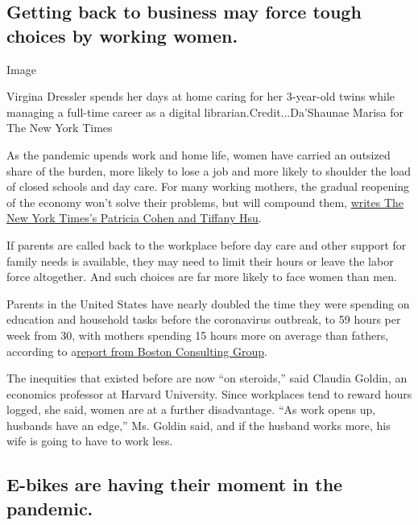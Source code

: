 \hypertarget{getting-back-to-business-may-force-tough-choices-by-working-women}{%
\subsection{Getting back to business may force tough choices by working
women.}\label{getting-back-to-business-may-force-tough-choices-by-working-women}}

Image

Virgina Dressler spends her days at home caring for her 3-year-old twins
while managing a full-time career as a digital
librarian.Credit...Da'Shaunae Marisa for The New York Times

As the pandemic upends work and home life, women have carried an
outsized share of the burden, more likely to lose a job and more likely
to shoulder the load of closed schools and day care. For many working
mothers, the gradual reopening of the economy won't solve their
problems, but will compound them,
\href{https://www.nytimes3xbfgragh.onion/2020/06/03/business/economy/coronavirus-working-women.html}{writes
The New York Times's Patricia Cohen and Tiffany Hsu}.

If parents are called back to the workplace before day care and other
support for family needs is available, they may need to limit their
hours or leave the labor force altogether. And such choices are far more
likely to face women than men.

Parents in the United States have nearly doubled the time they were
spending on education and household tasks before the coronavirus
outbreak, to 59 hours per week from 30, with mothers spending 15 hours
more on average than fathers, according to
a\href{https://www.bcg.com/publications/2020/helping-working-parents-ease-the-burden-of-covid-19.aspx}{report
from Boston Consulting Group}.

The inequities that existed before are now ``on steroids,'' said Claudia
Goldin, an economics professor at Harvard University. Since workplaces
tend to reward hours logged, she said, women are at a further
disadvantage. ``As work opens up, husbands have an edge,'' Ms. Goldin
said, and if the husband works more, his wife is going to have to work
less.

\hypertarget{e-bikes-are-having-their-moment-in-the-pandemic}{%
\subsection{E-bikes are having their moment in the
pandemic.}\label{e-bikes-are-having-their-moment-in-the-pandemic}}

